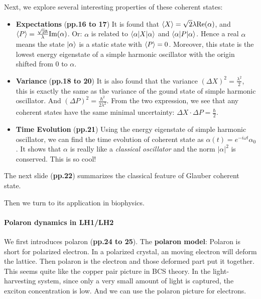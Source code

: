 \documentclass{article}
\numberwithin{equation}{subsection} %
\theoremstyle{definition}
\begin{document}
Next, we explore several interesting properties of these coherent
states:
\begin{itemize}
    \item \textbf{Expectations}
        (\textbf{pp.16 to 17}) It is found that 
        $\braket{X}=\sqrt{2}\lambda \text{Re}(\alpha)$,
        and $\braket{P} = \frac{\sqrt{2}\hbar}{\lambda} \text{Im}(\alpha)$. Or:
        $\alpha$ is related to $\braket{\alpha|X|\alpha}$
        and $\braket{\alpha|P|\alpha}$. Hence a real $\alpha$ means the state
        $\ket{\alpha}$ is a static state with $\braket{P}=0$. Moreover, this 
        state
        is the lowest energy eigenstate of a simple harmonic oscillator with
        the origin shifted from $0$ to $\alpha$. 
    \item \textbf{Variance}
        (\textbf{pp.18 to 20})
        It is also found that the variance 
        $(\Delta X)^2 = \frac{\lambda^2}{2}$,
        this is exactly the same as the variance of the gound state of simple
        harmonic oscillator.
        And $(\Delta P)^2 = \frac{\hbar^2}{2\lambda^2}$. 
        From the two expression,
        we see that any coherent states have the same minimal uncertainty:
        $\Delta X \cdot \Delta P = \frac{\hbar}{2}$.
    \item \textbf{Time Evolution}
        (\textbf{pp.21})
        Using the energy eigenstate of simple harmonic oscillator, we can find 
        the time evolution of coherent state as 
        $\alpha(t) = e^{-i\omega t} \alpha_0$. It shows that $\alpha$ is really
        like a \textit{classical oscillator} and the norm $|\alpha|^2$ is conserved. 
        This is so cool!
\end{itemize}

The next slide (\textbf{pp.22}) summarizes the classical feature of Glauber coherent state.

Then we turn to its application in biophysics.
\paragraph{Polaron dynamics in LH1/LH2} We first introduces polaron
(\textbf{pp.24 to 25}). The \textbf{polaron model}: Polaron
is short for polarized electron. In a polarized crystal, an moving electron
will deform the lattice. Then polaron is the electron and those deformed
part put it together. This seems quite like the copper pair picture in
BCS theory. In the light-harvesting system, since only a very small
amount of light is captured, the exciton concentration is low. And we can
use the polaron picture for electrons.
\end{document}
